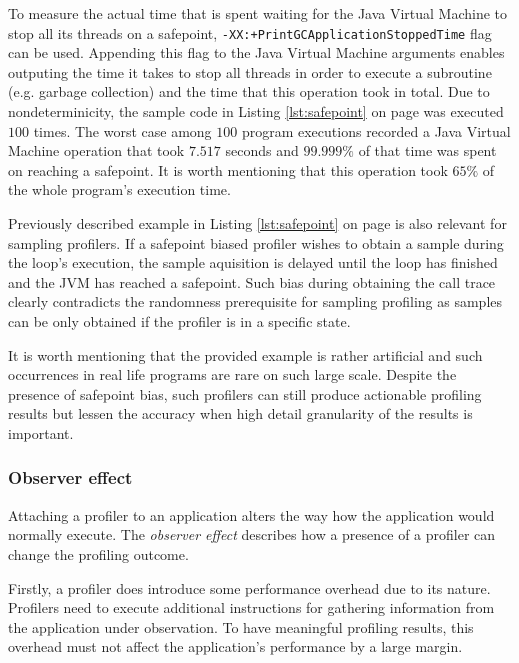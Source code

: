 \documentclass[..thesis.tex]{subfiles}
\begin{document}
To measure the actual time that is spent waiting for the Java Virtual Machine to stop all its threads on a safepoint, \texttt{-XX:+PrintGCApplicationStoppedTime} flag can be used. Appending this flag to the Java Virtual Machine arguments enables outputing the time it takes to stop all threads in order to execute a subroutine (e.g. garbage collection) and the time that this operation took in total. Due to nondeterminicity, the sample code in Listing \ref{lst:safepoint} on page \pageref{lst:safepoint} was executed $100$ times. The worst case among $100$ program executions recorded a Java Virtual Machine operation that took $7.517$ seconds and $99.999\%$ of that time was spent on reaching a safepoint. It is worth mentioning that this operation took $65\%$ of the whole program's execution time.

Previously described example in Listing \ref{lst:safepoint} on page \pageref{lst:safepoint} is also relevant for sampling profilers. If a safepoint biased profiler wishes to obtain a sample during the loop's execution, the sample aquisition is delayed until the loop has finished and the JVM has reached a safepoint. Such bias during obtaining the call trace clearly contradicts the randomness prerequisite for sampling profiling as samples can be only obtained if the profiler is in a specific state. 


It is worth mentioning that the provided example is rather artificial and such occurrences in real life programs are rare on such large scale. Despite the presence of safepoint bias, such profilers can still produce actionable profiling results but lessen the accuracy when high detail granularity of the results is important.

\subsubsection{Observer effect}

Attaching a profiler to an application alters the way how the application would normally execute. The \textit{observer effect} describes how a presence of a profiler can change the profiling outcome.
 
Firstly, a profiler does introduce some performance overhead due to its nature. Profilers need to execute additional instructions for gathering information from the application under observation. To have meaningful profiling results, this overhead must not affect the application's performance by a large margin.
\end{document}
